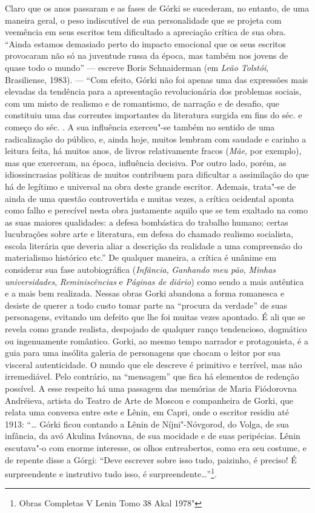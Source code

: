 Claro que os anos passaram e as fases de Górki se sucederam, no entanto,
de uma maneira geral, o peso indiscutível de sua personalidade que se
projeta com veemência em seus escritos tem dificultado a apreciação
crítica de sua obra. ``Ainda estamos demasiado perto do impacto
emocional que os seus escritos provocaram não só na juventude russa da
época, mas também nos jovens de quase todo o mundo'' --- escreve Boris
Schnaiderman (em \emph{Leão Tolstói}, Brasiliense, 1983). --- ``Com efeito, Górki não foi apenas uma das expressões
mais elevadas da tendência para a apresentação revolucionária dos
problemas sociais, com um misto de realismo e de romantismo, de narração
e de desafio, que constituiu uma das correntes importantes da literatura
surgida em fins do séc.  e começo do séc. . A sua influência
exerceu"-se também no sentido de uma radicalização do público, e, ainda
hoje, muitos lembram com saudade e carinho a leitura feita, há muitos
anos, de livros relativamente fracos (\emph{Mãe}, por exemplo), mas que
exerceram, na época, influência decisiva. Por outro lado, porém, as
idiossincrasias políticas de muitos contribuem para dificultar a
assimilação do que há de legítimo e universal na obra deste grande
escritor. Ademais, trata"-se de ainda de uma questão controvertida e
muitas vezes, a crítica ocidental aponta como falho e perecível nesta
obra justamente aquilo que se tem exaltado na  como as suas maiores
qualidades: a defesa bombástica do trabalho humano; certas lucubrações
sobre arte e literatura, em defesa do chamado realismo socialista,
escola literária que deveria aliar a descrição da realidade a uma
compreensão do materialismo histórico etc.'' De qualquer maneira, a
crítica é unânime em considerar sua fase autobiográfica
(\emph{Infância}, \emph{Ganhando meu pão}, \emph{Minhas universidades},
\emph{Reminiscências} e \emph{Páginas de diário}) como sendo a mais
autêntica e a mais bem realizada. Nessas obras Gorki abandona a forma
romanesca e desiste de querer a todo custo tomar parte na ``procura da
verdade'' de suas personagens, evitando um defeito que lhe foi muitas
vezes apontado. É ali que se revela como grande realista, despojado de
qualquer ranço tendencioso, dogmático ou ingenuamente romântico. Gorki,
ao mesmo tempo narrador e protagonista, é a guia para uma insólita
galeria de personagens que chocam o leitor por sua visceral
autenticidade. O mundo que ele descreve é primitivo e terrível, mas não
irremediável. Pelo contrário, na ``mensagem'' que fica há elementos de
redenção possível. A esse respeito há uma passagem das memórias de Maria
Fiódorovna Andréieva, artista do Teatro de Arte de Moscou e companheira
de Gorki, que relata uma conversa entre este e Lênin, em Capri, onde o
escritor residiu até 1913: ``\ldots{} Górki ficou contando a Lênin de
Níjni"-Nóvgorod, do Volga, de sua infância, da avó Akulina Ivânovna, de
sua mocidade e de suas peripécias. Lênin escutava"-o com enorme
interesse, os olhos entreabertos, como era seu costume, e de repente
disse a Górgi: ``Deve escrever sobre isso tudo, paizinho, é preciso! É
surpreendente e instrutivo tudo isso, é surpreendente\ldots{}''\footnote{Obras
  Completas V Lenin Tomo 38 Akal
  1978"}.

